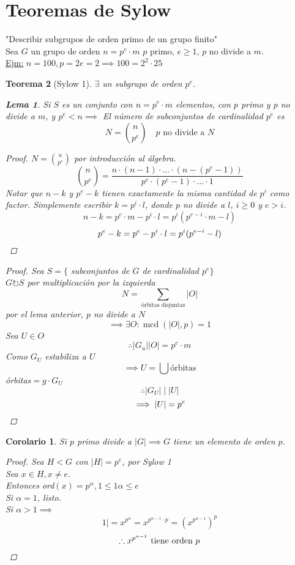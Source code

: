 \documentclass[11pt]{book}
\DeclareMathOperator{\mcd}{mcd}
\newtheorem{thm}{Teorema}[section]
\newtheorem{lem}[thm]{Lema}
\newtheorem*{cor}{Corolario}
\theoremstyle{definition}
\begin{document}
\section{Teoremas de Sylow}
"Describir subgrupos de orden primo de un grupo finito"\\
Sea $G$ un grupo de orden $n=p^e\cdot m$ $p$ primo, $e\geq 1$, $p$ no divide a $m$.\\
\underline{Ejm:} $n=100, p=2 e=2\implies 100=2^2\cdot 25$
\begin{thm}[Sylow 1]
	$\exists$ un subgrupo de orden $p^e$.
	\begin{lem}
		Si $S$ es un conjunto con $n=p^e\cdot m$ elementos, con $p$ primo y $p$ no divide a $m$, y $p^e<n\implies$ El número de subconjuntos de cardinalidad $p^e$ es
		\[N=\binom{n}{p^e}\quad p\textrm{ no divide a } N\]
		\begin{proof}
			$N=\binom{n}{p^e}$ por introducción al álgebra.
			\[\binom{n}{p^e}=\frac{n\cdot(n-1)\cdot...\cdot (n-(p^e-1))}{p^e\cdot (p^e-1)\cdot...\cdot 1}\]
			Notar que $n-k$ y $p^e-k$ tienen exactamente la misma cantidad de $p^i$ como factor. Simplemente escribir $k=p^i\cdot l$, donde $p$ no divide a $l$, $i\geq 0$ y $e>i$.
			\[n-k=p^e\cdot m-p^i\cdot l=p^i(p^{e-i}\cdot m-l)\]
			\[p^e-k=p^e-p^i\cdot l=p^i(p^{e-i}-l)\qedhere\]
		\end{proof}
	\end{lem}
	\begin{proof}
		Sea $S=\{$ subconjuntos de $G$ de cardinalidad $p^e\}$\\
		$G\circlearrowright S$ por multiplicación por la izquierda
		\[N=\sum_{\textrm{órbitas disjuntas}}|O|\]
		por el lema anterior, $p$ no divide a $N$
		\[\implies \exists O:\mcd(|O|,p)=1\]
		Sea $U\in O$
		\[\therefore |G_u||O|=p^e\cdot m\]
		Como $G_U$ estabiliza a $U$
		\[\implies U=\bigcup\textrm{órbitas}\]
		órbitas$=g\cdot G_U$
		\[\therefore |G_U|\mid|U|\]
		\[\implies|U|=p^e\qedhere\]
	\end{proof}
\end{thm}
\begin{cor}
	Si $p$ primo divide a $|G|\implies G$ tiene un elemento de orden $p$.
	\begin{proof}
		Sea $H<G$ con $|H|=p^e$, por Sylow 1\\
		Sea $x\in H,x\neq e$.\\
		Entonces ord$(x)=p^\alpha,1\leq 1 \alpha\leq e$\\
		Si $\alpha=1$, listo.\\
		Si $\alpha>1\implies$
		\[1|=x^{p^{\alpha}}=x^{p^{\alpha-1}\cdot p}=(x^{p^{\alpha-1}})^p\]
		\[\therefore x^{p^{\alpha-1}}\textrm{ tiene orden }p\qedhere\]
	\end{proof}  
\end{cor}
\end{document}

